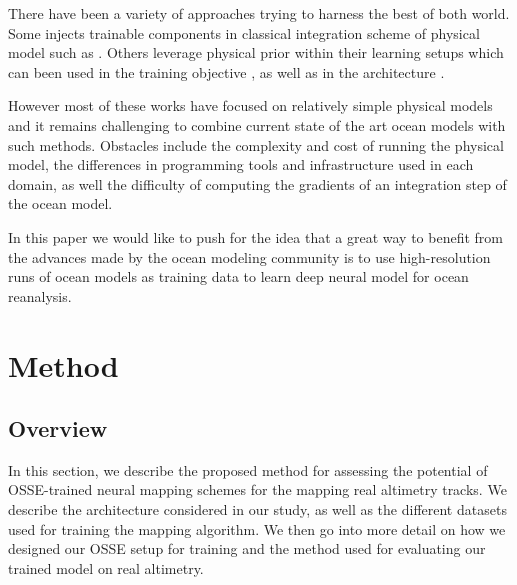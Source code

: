 \documentclass[draft]{agujournal2019}
\begin{document}
There have been a variety of approaches trying to harness the best of both world. Some injects trainable components in classical integration scheme of physical model such as . Others leverage physical prior within their learning setups which can been used in the training objective \cite{raissiPhysicsinformedNeuralNetworks2019,greydanusHamiltonianNeuralNetworks2019}, as well as in the architecture \cite{li2020fourier,Wang2020TF}. 

However most of these works have focused on relatively simple physical models and it remains challenging to combine current state of the art ocean models with such methods. Obstacles include the complexity and cost of running the physical model, the differences in programming tools and infrastructure used in each domain, as well the difficulty of computing the gradients of an integration step of the ocean model.

In this paper we would like to push for the idea that a great way to benefit from the advances made by the ocean modeling community is to use high-resolution runs of ocean models as training data to learn deep neural model for ocean reanalysis. 





\section{Method}
\label{sec:method}


\subsection{Overview}
\label{ssec:overview}

In this section, we describe the proposed method for assessing the potential of OSSE-trained neural mapping schemes for the mapping real altimetry tracks. We describe the architecture considered in our study, as well as the different datasets used for training the mapping algorithm. We then go into more detail on how we designed our OSSE setup for training and the method used for evaluating our trained model on real altimetry.  
\end{document}
